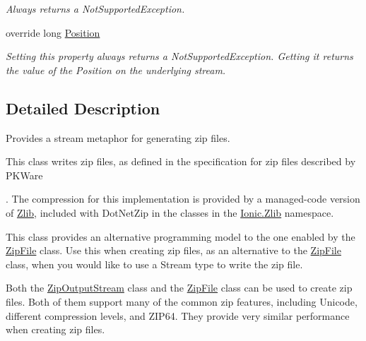 \begin{DoxyCompactItemize}
\begin{DoxyCompactList}\small\item\em Always returns a Not\+Supported\+Exception. \end{DoxyCompactList}\item 
override long \mbox{\hyperlink{class_super_tiled2_unity_1_1_ionic_1_1_zip_1_1_zip_output_stream_a0b9d9a664498cd382a763dc674c0c01f}{Position}}
\begin{DoxyCompactList}\small\item\em Setting this property always returns a Not\+Supported\+Exception. Getting it returns the value of the Position on the underlying stream. \end{DoxyCompactList}\end{DoxyCompactItemize}


\subsection{Detailed Description}
Provides a stream metaphor for generating zip files. 

This class writes zip files, as defined in the specification for zip files described by P\+K\+Ware

. The compression for this implementation is provided by a managed-\/code version of \mbox{\hyperlink{namespace_super_tiled2_unity_1_1_ionic_1_1_zlib}{Zlib}}, included with Dot\+Net\+Zip in the classes in the \mbox{\hyperlink{namespace_super_tiled2_unity_1_1_ionic_1_1_zlib}{Ionic.\+Zlib}} namespace. 

This class provides an alternative programming model to the one enabled by the \mbox{\hyperlink{class_super_tiled2_unity_1_1_ionic_1_1_zip_1_1_zip_file}{Zip\+File}} class. Use this when creating zip files, as an alternative to the \mbox{\hyperlink{class_super_tiled2_unity_1_1_ionic_1_1_zip_1_1_zip_file}{Zip\+File}} class, when you would like to use a {\ttfamily Stream} type to write the zip file. 

Both the {\ttfamily \mbox{\hyperlink{class_super_tiled2_unity_1_1_ionic_1_1_zip_1_1_zip_output_stream}{Zip\+Output\+Stream}}} class and the {\ttfamily \mbox{\hyperlink{class_super_tiled2_unity_1_1_ionic_1_1_zip_1_1_zip_file}{Zip\+File}}} class can be used to create zip files. Both of them support many of the common zip features, including Unicode, different compression levels, and Z\+I\+P64. They provide very similar performance when creating zip files. 

